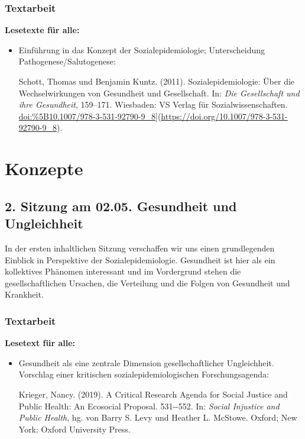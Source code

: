 \documentclass[
  ngerman,
]{article}
\begin{document}
\hypertarget{textarbeit}{%
\subsubsection*{Textarbeit}\label{textarbeit}}

\textbf{Lesetexte für alle:}

\begin{itemize}
\item
  Einführung in das Konzept der Sozialepidemiologie; Unterscheidung Pathogenese/Salutogenese:

  Schott, Thomas und Benjamin Kuntz. (2011). Sozialepidemiologie: Über die Wechselwirkungen von Gesundheit und Gesellschaft. In: \emph{Die Gesellschaft und ihre Gesundheit}, 159--171. Wiesbaden: VS Verlag für Sozialwissenschaften. \url{doi:\%5B10.1007/978-3-531-92790-9_8}{]}(\url{https://doi.org/10.1007/978-3-531-92790-9_8}).
\end{itemize}

\hypertarget{konzepte}{%
\section*{Konzepte}\label{konzepte}}

\hypertarget{sitzung-am-02.05.-gesundheit-und-ungleichheit}{%
\subsection*{2. Sitzung am 02.05. \textbar{} Gesundheit und Ungleichheit}\label{sitzung-am-02.05.-gesundheit-und-ungleichheit}}

In der ersten inhaltlichen Sitzung verschaffen wir uns einen grundlegenden Einblick in Perspektive der Sozialepidemiologie. Gesundheit ist hier als ein kollektives Phänomen interessant und im Vordergrund stehen die gesellschaftlichen Ursachen, die Verteilung und die Folgen von Gesundheit und Krankheit.

\hypertarget{textarbeit-1}{%
\subsubsection*{Textarbeit}\label{textarbeit-1}}

\textbf{Lesetext für alle:}

\begin{itemize}
\item
  Gesundheit als eine zentrale Dimension gesellschaftlicher Ungleichheit. Vorschlag einer kritischen sozialepidemiologischen Forschungsagenda:

  Krieger, Nancy. (2019). A Critical Research Agenda for Social Justice and Public Health: An Ecosocial Proposal. 531-\/-552. In: \emph{Social Injustice and Public Health}, hg. von Barry S. Levy und Heather L. McStowe. Oxford; New York: Oxford University Press.
\end{itemize}
\end{document}
